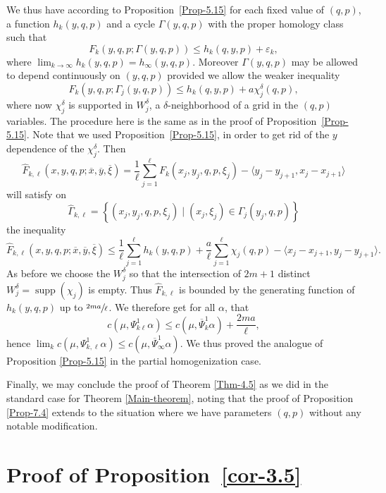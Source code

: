 \documentclass[JEP,XML,SOM,NoFloatCountersInSection,Unicode,published]{cedram}
\numberwithin{equation}{section}
\DeclareMathOperator{\supp}{supp}
\theoremstyle{plain}
\theoremstyle{definition}
\theoremstyle{remark}
\begin{document}
We thus have according to Proposition~\ref{Prop-5.15} for each fixed value of $(q,p)$, a function $h_{k}(y,q,p)$ and a cycle $\Gamma(y,q,p)$ with the proper homology class such that
\[
F_{k}(y,q,p; \Gamma (y,q,p)) \leq h_{k}(q,y,p)+ \varepsilon_k,
\]
where $\lim_{k\to \infty }h_{k}(y,q,p)=h_{\infty}(y,q,p)$.
Moreover $\Gamma(y,q,p)$ may be allowed to depend continuously on $(y,q,p)$ provided we allow the weaker inequality
\[
F_{k}(y,q,p; \Gamma_{j}(y,q,p)) \leq h_{k}(q,y,p) +a \chi_{j}^{\delta}(q,p),
\]
where now $\chi_{j}^{\delta}$ is supported in $W_{j}^{\delta}$, a $\delta$-neighborhood of a grid in the $(q,p)$ variables. The procedure here is the same as in the proof of Proposition~\ref{Prop-5.15}. Note that we used Proposition~\ref{Prop-5.15}, in order to get rid of the $y$ dependence of the $\chi_{j}^{\delta}$.
Then
\[
\widehat F_{k,\ell}(x,y,q,p; \overline x, \overline y, \overline \xi) = \frac{1}{\ell} \sum_{j=1}^{\ell} F_{k}(x_{j},y_{j},q,p,\xi_{j}) - \langle y_{j}-y_{j+1}, x_{j}-x_{j+1}\rangle
\]
will satisfy on
\[
\widehat\Gamma_{k,\ell} = \left\{ (x_{j},y_{j},q,p,\xi_{j}) \mid (x_{j},\xi_{j}) \in \Gamma_{j}(y_{j},q,p) \right \}
\]
the inequality
\[
\widehat F_{k,\ell}(x,y,q,p; \overline x, \overline y, \overline \xi) \leq \frac{1}{\ell} \sum_{j=1}^{\ell}h_k(y,q,p)+\frac{a}{\ell} \sum_{j=1}^{\ell}\chi_j(q,p) - \langle x_{j}-x_{j+1}, y_{j}-y_{j+1}\rangle.
\]
As before we choose the $W^{\delta}_{j}$ so that the intersection of $2m+1$ distinct $W^{\delta}_{j} =\supp (\chi_{j})$ is empty.
Thus $\widehat F_{k,\ell}$ is bounded by the generating function of $h_{k}(y,q,p)$ up to $\sfrac{2ma}{\ell}$.
We therefore get for all $\alpha$, that
\[
c(\mu, \Psi_{k\ell}^1\alpha) \leq c(\mu, \overline\Psi_{k}^{1}\alpha) + \frac{2ma}{\ell},
\]
hence $\lim_k c(\mu, \Psi_{k,\ell}^1\alpha) \leq c(\mu, \overline\Psi_{\infty}^{1}\alpha)$. We thus proved the analogue of Proposition \ref{Prop-5.15} in the partial homogenization case.

Finally, we may conclude the proof of Theorem \ref{Thm-4.5} as we did in the standard case for Theorem \ref{Main-theorem}, noting that the proof of Proposition \ref{Prop-7.4} extends to the situation where we have parameters $(q,p)$ without any notable modification.

\section{Proof of Proposition~\ref{cor-3.5}}
\end{document}
